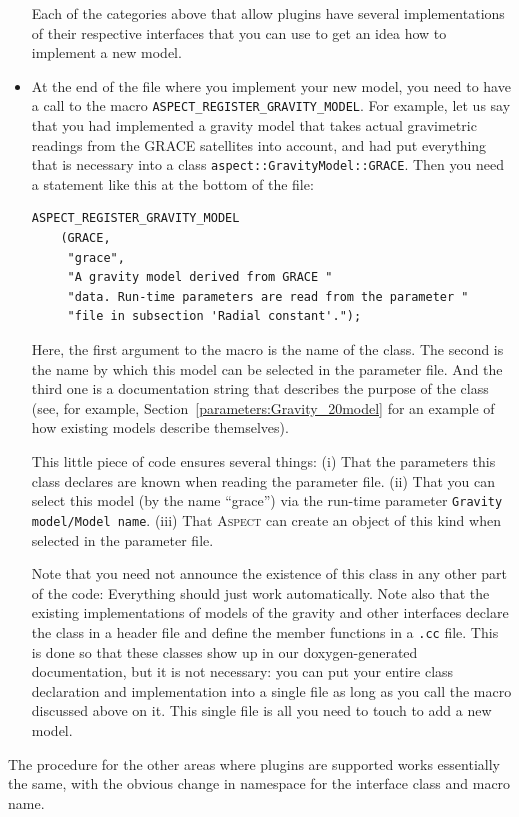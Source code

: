 \documentclass{article}
\newcommand{\aspect}{\textsc{Aspect}}
\begin{document}
\begin{itemize}
  Each of the categories above that allow plugins have several implementations
  of their respective interfaces that you can use to get an idea how to
  implement a new model.

\item At the end of the file where you implement your new model, you need to
  have a call to the macro \texttt{ASPECT\_REGISTER\_GRAVITY\_MODEL}. For
  example, let us say that you had implemented a gravity model that takes
  actual gravimetric readings from the GRACE satellites into account, and had
  put everything that is necessary into a class
  \texttt{aspect::GravityModel::GRACE}. Then you need a statement like this at
  the bottom of the file:
  \begin{lstlisting}[frame=single]
    ASPECT_REGISTER_GRAVITY_MODEL
    (GRACE,
     "grace",
     "A gravity model derived from GRACE "
     "data. Run-time parameters are read from the parameter "
     "file in subsection 'Radial constant'.");
  \end{lstlisting}
  Here, the first argument to the macro is the name of the class. The second
  is the name by which this model can be selected in the parameter file. And
  the third one is a documentation string that describes the purpose of the
  class (see, for example, Section~\ref{parameters:Gravity_20model} for an
  example of how existing models describe themselves).

  This little piece of code ensures several things: (i) That the parameters
  this class declares are known when reading the parameter file. (ii) That you
  can select this model (by the name ``grace'') via the run-time parameter
  \texttt{Gravity model/Model name}. (iii) That \aspect{} can create an object
  of this kind when selected in the parameter file.

  Note that you need not announce the existence of this class in any other
  part of the code: Everything should just work automatically. Note also that
  the existing implementations of models of the gravity and other interfaces
  declare the class in a header file and define the member functions in a
  \texttt{.cc} file. This is done so that these classes show up in our
  doxygen-generated documentation, but it is not necessary: you can put your
  entire class declaration and implementation into a single file as long as
  you call the macro discussed above on it. This single file is all you need
  to touch to add a new model.
\end{itemize}

The procedure for the other areas where plugins are supported works
essentially the same, with the obvious change in namespace for the interface
class and macro name.
\end{document}
